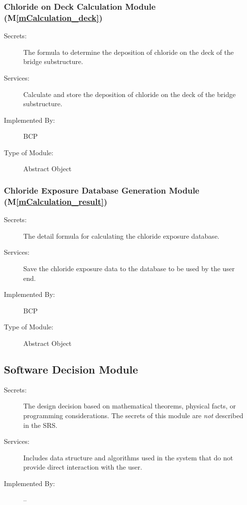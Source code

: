 \documentclass[12pt, titlepage]{article}
\newcommand{\mref}[1]{M\ref{#1}}
\begin{document}
\subsubsection{Chloride on Deck Calculation Module (\mref{mCalculation_deck})}
\begin{description}
\item[Secrets:] The formula to determine the deposition of chloride on the deck of the bridge substructure.
\item[Services:] Calculate and store the deposition of chloride on the deck of the bridge substructure.
\item[Implemented By:] BCP
\item[Type of Module:] Abstract Object
\end{description}


\subsubsection{Chloride Exposure Database Generation Module (\mref{mCalculation_result})}
\begin{description}
\item[Secrets:] The detail formula for calculating the chloride exposure database.
\item[Services:] Save the chloride exposure data to the database to be used by the user end.
\item[Implemented By:] BCP
\item[Type of Module:] Abstract Object
\end{description}


\subsection{Software Decision Module}

\begin{description}
\item[Secrets:] The design decision based on mathematical theorems, physical
  facts, or programming considerations. The secrets of this module are
  \emph{not} described in the SRS.
\item[Services:] Includes data structure and algorithms used in the system that
  do not provide direct interaction with the user. 
\item[Implemented By:] --
\end{description}
\end{document}

